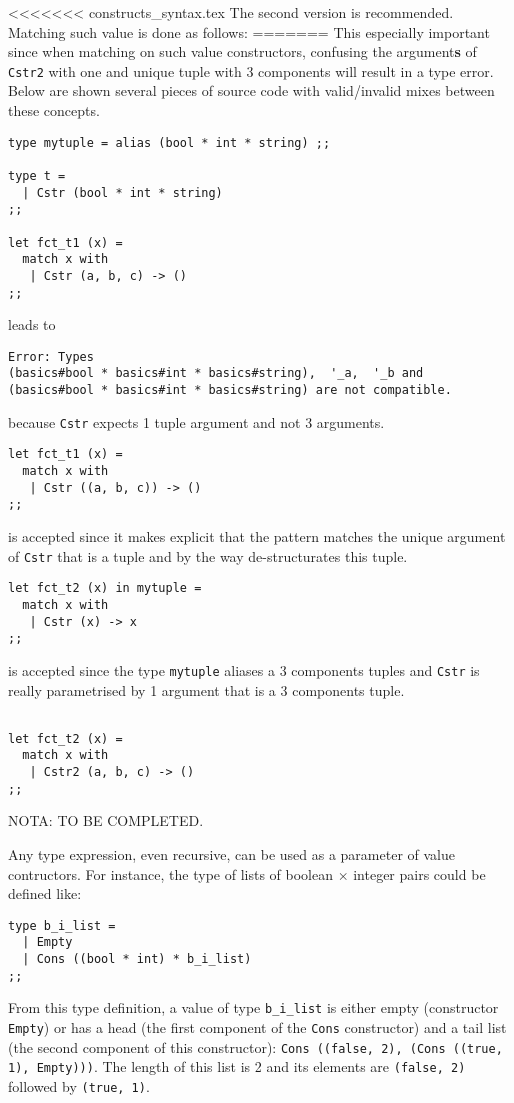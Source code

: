 <<<<<<< constructs_syntax.tex
The second version is recommended. Matching such value is done as follows:
=======
\medskip
This especially important since when matching on such value
constructors, confusing the argument{\bf s} of {\tt Cstr2} with
one and unique tuple with 3 components will result in a type error.
Below are shown several pieces of source code with valid/invalid mixes
between these concepts.
{\scriptsize
\begin{lstlisting}
type mytuple = alias (bool * int * string) ;;

type t =
  | Cstr (bool * int * string)
;;

let fct_t1 (x) =
  match x with
   | Cstr (a, b, c) -> ()
;;
\end{lstlisting}
}
\noindent leads to
\begin{verbatim}
Error: Types
(basics#bool * basics#int * basics#string),  '_a,  '_b and
(basics#bool * basics#int * basics#string) are not compatible.
\end{verbatim}
\noindent because {\tt Cstr} expects 1 tuple argument and not 3
arguments.

\medskip
{\scriptsize
\begin{lstlisting}
let fct_t1 (x) =
  match x with
   | Cstr ((a, b, c)) -> ()
;;
\end{lstlisting}
}
\noindent is accepted since it makes explicit that the pattern matches
the unique argument of {\tt Cstr} that is a tuple and by the way
de-structurates this tuple.

\medskip
{\scriptsize
\begin{lstlisting}
let fct_t2 (x) in mytuple =
  match x with
   | Cstr (x) -> x
;;
\end{lstlisting}
}
\noindent is accepted since the type {\tt mytuple} aliases a 3
components tuples and {\tt Cstr} is really parametrised by 1 argument
that is a 3 components tuple.

{\scriptsize
\begin{lstlisting}

let fct_t2 (x) =
  match x with
   | Cstr2 (a, b, c) -> ()
;;
\end{lstlisting}
}

NOTA: TO BE COMPLETED.

Any type expression, even recursive, can be used as a  parameter of
value contructors.
For instance, the type of lists of boolean $\times$ integer pairs
could be defined like:
{\scriptsize
\begin{lstlisting}
type b_i_list =
  | Empty
  | Cons ((bool * int) * b_i_list)
;;
\end{lstlisting}
} From this type definition, a value of type {\tt b\_i\_list} is
either empty (constructor {\tt Empty}) or has a head (the first
component of the {\tt Cons} constructor) and a tail list (the
second component of this constructor): {\tt Cons ((false, 2), (Cons
  ((true, 1), Empty)))}. The length of this list is 2 and its
elements are {\tt (false, 2)} followed by {\tt (true, 1)}.

